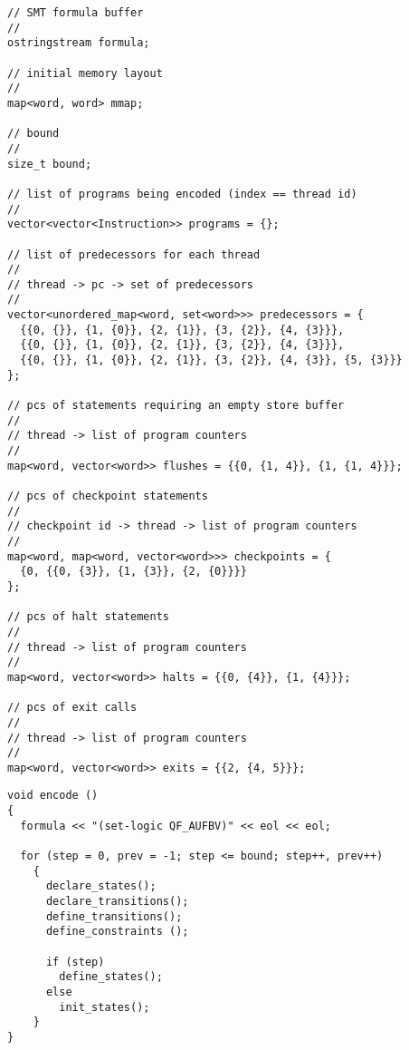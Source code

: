 \begin{lstlisting}[style=c++]
// SMT formula buffer
//
ostringstream formula;

// initial memory layout
//
map<word, word> mmap;

// bound
//
size_t bound;

// list of programs being encoded (index == thread id)
//
vector<vector<Instruction>> programs = {};

// list of predecessors for each thread
//
// thread -> pc -> set of predecessors
//
vector<unordered_map<word, set<word>>> predecessors = {
  {{0, {}}, {1, {0}}, {2, {1}}, {3, {2}}, {4, {3}}},
  {{0, {}}, {1, {0}}, {2, {1}}, {3, {2}}, {4, {3}}},
  {{0, {}}, {1, {0}}, {2, {1}}, {3, {2}}, {4, {3}}, {5, {3}}}
};

// pcs of statements requiring an empty store buffer
//
// thread -> list of program counters
//
map<word, vector<word>> flushes = {{0, {1, 4}}, {1, {1, 4}}};

// pcs of checkpoint statements
//
// checkpoint id -> thread -> list of program counters
//
map<word, map<word, vector<word>>> checkpoints = {
  {0, {{0, {3}}, {1, {3}}, {2, {0}}}}
};

// pcs of halt statements
//
// thread -> list of program counters
//
map<word, vector<word>> halts = {{0, {4}}, {1, {4}}};

// pcs of exit calls
//
// thread -> list of program counters
//
map<word, vector<word>> exits = {{2, {4, 5}}};
\end{lstlisting}


\begin{algorithm}[H]
\end{algorithm}

\begin{lstlisting}[style=c++]
void encode ()
{
  formula << "(set-logic QF_AUFBV)" << eol << eol;

  for (step = 0, prev = -1; step <= bound; step++, prev++)
    {
      declare_states();
      declare_transitions();
      define_transitions();
      define_constraints ();

      if (step)
        define_states();
      else
        init_states();
    }
}
\end{lstlisting}

